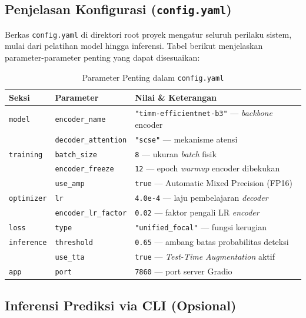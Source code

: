 \documentclass[12pt,a4paper]{article}
\begin{document}
\subsection{Penjelasan Konfigurasi (\texttt{config.yaml})}

Berkas \texttt{config.yaml} di direktori root proyek mengatur seluruh perilaku
sistem, mulai dari pelatihan model hingga inferensi. Tabel berikut menjelaskan
parameter-parameter penting yang dapat disesuaikan:

\begin{table}[H]
\centering
\caption{Parameter Penting dalam \texttt{config.yaml}}
\begin{tabularx}{\textwidth}{l l X}
\toprule
\textbf{Seksi}   & \textbf{Parameter}           & \textbf{Nilai \& Keterangan} \\
\midrule
\texttt{model}   & \texttt{encoder\_name}       & \texttt{"timm-efficientnet-b3"} — \textit{backbone} encoder \\
                 & \texttt{decoder\_attention}  & \texttt{"scse"} — mekanisme atensi \\
\texttt{training}& \texttt{batch\_size}         & \texttt{8} — ukuran \textit{batch} fisik \\
                 & \texttt{encoder\_freeze}     & \texttt{12} — epoch \textit{warmup} encoder dibekukan \\
                 & \texttt{use\_amp}            & \texttt{true} — Automatic Mixed Precision (FP16) \\
\texttt{optimizer}& \texttt{lr}                 & \texttt{4.0e-4} — laju pembelajaran \textit{decoder} \\
                 & \texttt{encoder\_lr\_factor} & \texttt{0.02} — faktor pengali LR \textit{encoder} \\
\texttt{loss}    & \texttt{type}                & \texttt{"unified\_focal"} — fungsi kerugian \\
\texttt{inference}& \texttt{threshold}          & \texttt{0.65} — ambang batas probabilitas deteksi \\
                 & \texttt{use\_tta}            & \texttt{true} — \textit{Test-Time Augmentation} aktif \\
\texttt{app}     & \texttt{port}                & \texttt{7860} — port server Gradio \\
\bottomrule
\end{tabularx}
\end{table}

\subsection{Inferensi Prediksi via CLI (Opsional)}
\end{document}

